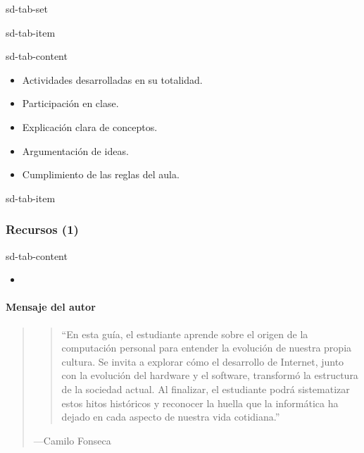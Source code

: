 \documentclass[letterpaper,10pt,spanish]{sphinxmanual}
\begin{document}
\begin{sphinxuseclass}{sd-tab-set}
\begin{sphinxuseclass}{sd-tab-item}
\begin{sphinxuseclass}{sd-tab-content}\begin{itemize}
\item {} 
\sphinxAtStartPar
Actividades desarrolladas en su totalidad.

\item {} 
\sphinxAtStartPar
Participación en clase.

\item {} 
\sphinxAtStartPar
Explicación clara de conceptos.

\item {} 
\sphinxAtStartPar
Argumentación de ideas.

\item {} 
\sphinxAtStartPar
Cumplimiento de las reglas del aula.

\end{itemize}

\end{sphinxuseclass}
\end{sphinxuseclass}
\begin{sphinxuseclass}{sd-tab-item}\subsubsection*{Recursos (1)}

\begin{sphinxuseclass}{sd-tab-content}\begin{itemize}
\item {} 
\sphinxAtStartPar
{\hyperref[\detokenize{cursos/informatica10/recursos/T01::doc}]{}}

\end{itemize}

\end{sphinxuseclass}
\end{sphinxuseclass}
\end{sphinxuseclass}

\paragraph{Mensaje del autor}
\label{\detokenize{cursos/informatica10/periodo01/G01:mensaje-del-autor}}\begin{quote}
\begin{quote}

\sphinxAtStartPar
“En esta guía, el estudiante aprende sobre el origen de la computación personal para entender la evolución de nuestra propia cultura. Se invita a explorar cómo el desarrollo de Internet, junto con la evolución del hardware y el software, transformó la estructura de la sociedad actual. Al finalizar, el estudiante podrá sistematizar estos hitos históricos y reconocer la huella que la informática ha dejado en cada aspecto de nuestra vida cotidiana.”
\end{quote}

\begin{flushright}
---Camilo Fonseca
\end{flushright}
\end{quote}
\end{document}
